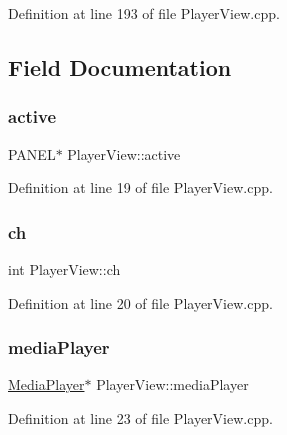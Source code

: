Definition at line 193 of file Player\+View.\+cpp.



\subsection{Field Documentation}
\mbox{\label{class_player_view_ab62df18de9e4fa1ad686b5010914ff4f}} 
\subsubsection{\texorpdfstring{active}{active}}
{\footnotesize\ttfamily P\+A\+N\+EL$\ast$ Player\+View\+::active\hspace{0.3cm}{\ttfamily [private]}}



Definition at line 19 of file Player\+View.\+cpp.

\mbox{\label{class_player_view_a6e9e9e5e62de0af20a7d0d128698e848}} 
\subsubsection{\texorpdfstring{ch}{ch}}
{\footnotesize\ttfamily int Player\+View\+::ch\hspace{0.3cm}{\ttfamily [private]}}



Definition at line 20 of file Player\+View.\+cpp.

\mbox{\label{class_player_view_aaac93a2dff29c6032a7ed3980f16341c}} 
\subsubsection{\texorpdfstring{media\+Player}{mediaPlayer}}
{\footnotesize\ttfamily \mbox{\hyperlink{class_media_player}{Media\+Player}}$\ast$ Player\+View\+::media\+Player\hspace{0.3cm}{\ttfamily [private]}}



Definition at line 23 of file Player\+View.\+cpp.

